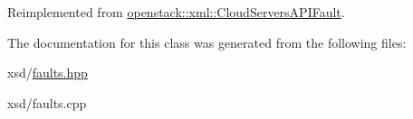 Reimplemented from \hyperlink{classopenstack_1_1xml_1_1CloudServersAPIFault_a29ace5d37cf3fd9b457e2aa968079505}{openstack::xml::CloudServersAPIFault}.



The documentation for this class was generated from the following files:\begin{DoxyCompactItemize}
\item 
xsd/\hyperlink{faults_8hpp}{faults.hpp}\item 
xsd/faults.cpp\end{DoxyCompactItemize}
